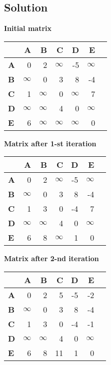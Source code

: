 \documentclass{article}
\begin{document}
\subsection{Solution}

\textbf{Initial matrix}
\begin{table}[!htp]\centering
    \scriptsize
    \begin{tabular}{lrrrrrr}\toprule
    &\textbf{A} &\textbf{B} &\textbf{C} &\textbf{D} &\textbf{E} \\\midrule
    \textbf{A} &0 &2 &$\infty$ &-5 &$\infty$ \\
    \textbf{B} &$\infty$ &0 &3 &8 &-4 \\
    \textbf{C} &1 &$\infty$ &0 &$\infty$ &7 \\
    \textbf{D} &$\infty$ &$\infty$ &4 &0 &$\infty$ \\
    \textbf{E} &6 &$\infty$ &$\infty$ &$\infty$ &0 \\
    \bottomrule
    \end{tabular}
\end{table}

\textbf{Matrix after 1-st iteration}
\begin{table}[!htp]\centering
    \scriptsize
    \begin{tabular}{lrrrrrr}\toprule
    &\textbf{A} &\textbf{B} &\textbf{C} &\textbf{D} &\textbf{E} \\\midrule
    \textbf{A} &0 &2 &$\infty$ &-5 &$\infty$ \\
    \textbf{B} &$\infty$ &0 &3 &8 &-4 \\
    \textbf{C} &1 &3 &0 &-4 &7 \\
    \textbf{D} &$\infty$ &$\infty$ &4 &0 &$\infty$ \\
    \textbf{E} &6 &8 &$\infty$ &1 &0 \\
    \bottomrule
    \end{tabular}
\end{table}

\newpage

\textbf{Matrix after 2-nd iteration}
\begin{table}[!htp]\centering
    \scriptsize
    \begin{tabular}{lrrrrrr}\toprule
    &\textbf{A} &\textbf{B} &\textbf{C} &\textbf{D} &\textbf{E} \\\midrule
    \textbf{A} &0 &2 &5 &-5 &-2 \\
    \textbf{B} &$\infty$ &0 &3 &8 &-4 \\
    \textbf{C} &1 &3 &0 &-4 &-1 \\
    \textbf{D} &$\infty$ &$\infty$ &4 &0 &$\infty$ \\
    \textbf{E} &6 &8 &11 &1 &0 \\
    \bottomrule
    \end{tabular}
\end{table}
\end{document}
